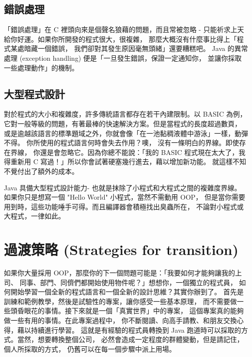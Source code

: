 \subsection{錯誤處理}
「錯誤處理」在 C 裡頭向來是個聲名狼藉的問題，而且常被忽略 -
只能祈求上天給你好運。如果你所開發的程式很大，很複雜，
那麼大概沒有什麼事比得上「程式某處暗藏一個錯誤，
我們卻對其發生原因毫無頭緒」還要糟糕吧。 Java 的異常處理
(exception handling) 便是「一旦發生錯誤，保證一定通知你，
並讓你採取一些處理動作」的機制。
\subsection{大型程式設計}
對於程式的大小和複雜度，許多傳統語言都存在若干內建限制。以 BASIC 為例，
它對一般等級的問題，有著最棒的快速解決方案。但是當程式的長度超過數頁，
或是逾越該語言的標準題域之外，你就會像「在一池黏稠液體中游泳」一樣，動彈不得。
你所使用的程式語言何時會失去作用？噢， 沒有一條明白的界線。即使存在界線，
你還是會忽略它。因為你總不能說：「我的 BASIC 程式現在太大了，我得重新用
C 寫過！」所以你會試著硬塞幾行進去，藉以增加新功能。
就這樣不知不覺付出了額外的成本。

Java 具備大型程式設計能力- 也就是抹除了小程式和大程式之間的複雜度界線。
如果你只是想寫一個 "Hello World" 小程式，當然不需動用 OOP，
但是當你需要用到時，這些功能唾手可得。而且編譯器會積極找出臭蟲所在，
不論對小程式或大程式，一律如此。

\section{過渡策略 (Strategies for transition)}
如果你大量採用 OOP，那麼你的下一個問題可能是：「我要如何才能夠讓我的上司、
同事、部門、同儕們都開始使用物件呢？」想想你，一個獨立的程式員，
如何開始學習一個全新的程式語言和一個全新的設計思維？其實你辦到了。
首先是訓練和範例教學，然後是試驗性的專案，讓你感受一些基本原理，
而不需要做一些頭昏眼花的事情。接下來就是一個「真實世界」中的專案，
這個專案真的能夠做一些有用的事情。在此專案過程中，
你不斷閱讀、向高手請教、和朋友交換心得，藉以持續進行學習。
這就是有經驗的程式員轉換到 Java 跑道時可以採取的方式。當然，想要轉換整個公司，
必然會造成一定程度的群體變動，但是請記住，個人所採取的方式，
仍舊可以在每一個步驟中派上用場。
